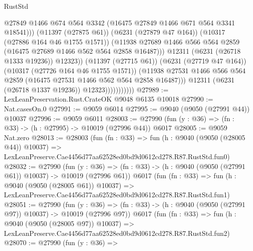 \begin{lexlean}{RustStd}
\begin{coremodule}
{{                                      @27849
                                      @1466
                                      @674
                                      @564
                                      @3342
                                      (@16475 @27849 @1466 @671 @564 @3341 @18541)))
                                  (@11397 (@27875 @61))
                                  (@6231 (@27879 @47 @164))
                                  (@10317 (@27886 @164 @46 @1755 @1571))
                                  (@11938
                                    @27689
                                    @1466
                                    @566
                                    @564
                                    @2859
                                    (@16475 @27689 @1466 @562 @564 @2858 @16487)))
                                @12311
                                (@6231 (@26718 @1333 @19236))
                                @12323))
                            (@11397 (@27715 @61))
                            (@6231 (@27719 @47 @164))
                            (@10317 (@27726 @164 @46 @1755 @1571))
                            (@11938
                              @27531
                              @1466
                              @566
                              @564
                              @2859
                              (@16475 @27531 @1466 @562 @564 @2858 @16487)))
                          @12311
                          (@6231 (@26718 @1337 @19236))
                          @12323)))))))))))
@27989 := LexLeanPreservation.Rust.CrateOK @9048 @6135 @10018
@27990 := Nat.casesOn.{0}
@27991 := @9059 @6014
@27995 := @9040 (@9050 (@27991 @44)) @10037
@27996 := @9059 @6011
@28003 := @27990 (fun (y : @36) => (fn : @33) -> (h : @27995) -> @10019 (@27996 @44)) @6017
@28005 := @9059 Nat.zero
@28013 := @28003
    (fun (fn : @33) =>
    fun (h : @9040 (@9050 (@28005 @44)) @10037) =>
    LexLeanPreserve.Cae4456d77aa62528ed0bd9d0612cd278.R87.RustStd.fun0)
@28032 := @27990
    (fun (y : @36) => (fn : @33) -> (h : @9040 (@9050 (@27991 @61)) @10037) -> @10019 (@27996 @61))
    @6017
    (fun (fn : @33) =>
    fun (h : @9040 (@9050 (@28005 @61)) @10037) =>
    LexLeanPreserve.Cae4456d77aa62528ed0bd9d0612cd278.R87.RustStd.fun1)
@28051 := @27990
    (fun (y : @36) => (fn : @33) -> (h : @9040 (@9050 (@27991 @97)) @10037) -> @10019 (@27996 @97))
    @6017
    (fun (fn : @33) =>
    fun (h : @9040 (@9050 (@28005 @97)) @10037) =>
    LexLeanPreserve.Cae4456d77aa62528ed0bd9d0612cd278.R87.RustStd.fun2)
@28070 := @27990
    (fun (y : @36) =>
}}
\end{coremodule}
\end{lexlean}
